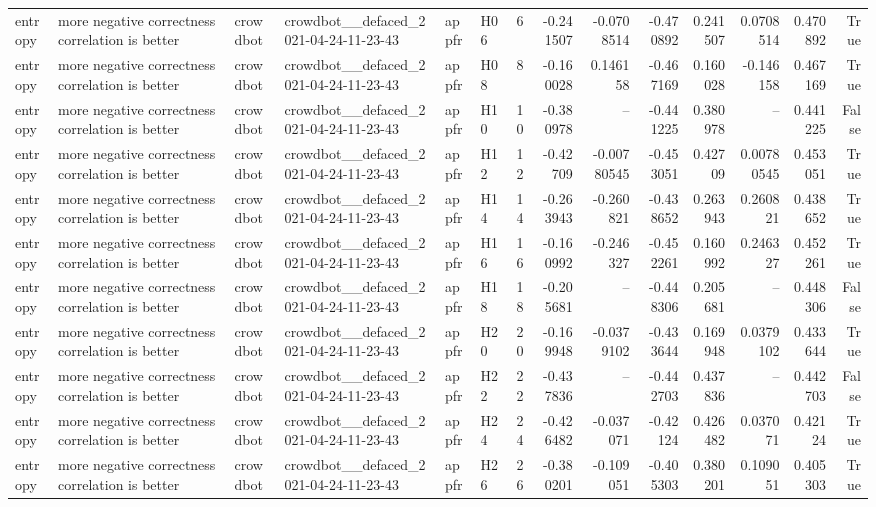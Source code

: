 \begin{longtable}{llllllrrrrrrrr}
entropy & more negative correctness correlation is better & crowdbot & crowdbot\_\_defaced\_2021-04-24-11-23-43 & appfr & H06 & 6 & -0.241507 & -0.0708514 & -0.470892 & 0.241507 & 0.0708514 & 0.470892 & True \\
entropy & more negative correctness correlation is better & crowdbot & crowdbot\_\_defaced\_2021-04-24-11-23-43 & appfr & H08 & 8 & -0.160028 & 0.146158 & -0.467169 & 0.160028 & -0.146158 & 0.467169 & True \\
entropy & more negative correctness correlation is better & crowdbot & crowdbot\_\_defaced\_2021-04-24-11-23-43 & appfr & H10 & 10 & -0.380978 & -- & -0.441225 & 0.380978 & -- & 0.441225 & False \\
entropy & more negative correctness correlation is better & crowdbot & crowdbot\_\_defaced\_2021-04-24-11-23-43 & appfr & H12 & 12 & -0.42709 & -0.00780545 & -0.453051 & 0.42709 & 0.00780545 & 0.453051 & True \\
entropy & more negative correctness correlation is better & crowdbot & crowdbot\_\_defaced\_2021-04-24-11-23-43 & appfr & H14 & 14 & -0.263943 & -0.260821 & -0.438652 & 0.263943 & 0.260821 & 0.438652 & True \\
entropy & more negative correctness correlation is better & crowdbot & crowdbot\_\_defaced\_2021-04-24-11-23-43 & appfr & H16 & 16 & -0.160992 & -0.246327 & -0.452261 & 0.160992 & 0.246327 & 0.452261 & True \\
entropy & more negative correctness correlation is better & crowdbot & crowdbot\_\_defaced\_2021-04-24-11-23-43 & appfr & H18 & 18 & -0.205681 & -- & -0.448306 & 0.205681 & -- & 0.448306 & False \\
entropy & more negative correctness correlation is better & crowdbot & crowdbot\_\_defaced\_2021-04-24-11-23-43 & appfr & H20 & 20 & -0.169948 & -0.0379102 & -0.433644 & 0.169948 & 0.0379102 & 0.433644 & True \\
entropy & more negative correctness correlation is better & crowdbot & crowdbot\_\_defaced\_2021-04-24-11-23-43 & appfr & H22 & 22 & -0.437836 & -- & -0.442703 & 0.437836 & -- & 0.442703 & False \\
entropy & more negative correctness correlation is better & crowdbot & crowdbot\_\_defaced\_2021-04-24-11-23-43 & appfr & H24 & 24 & -0.426482 & -0.037071 & -0.42124 & 0.426482 & 0.037071 & 0.42124 & True \\
entropy & more negative correctness correlation is better & crowdbot & crowdbot\_\_defaced\_2021-04-24-11-23-43 & appfr & H26 & 26 & -0.380201 & -0.109051 & -0.405303 & 0.380201 & 0.109051 & 0.405303 & True \\

\end{longtable}
